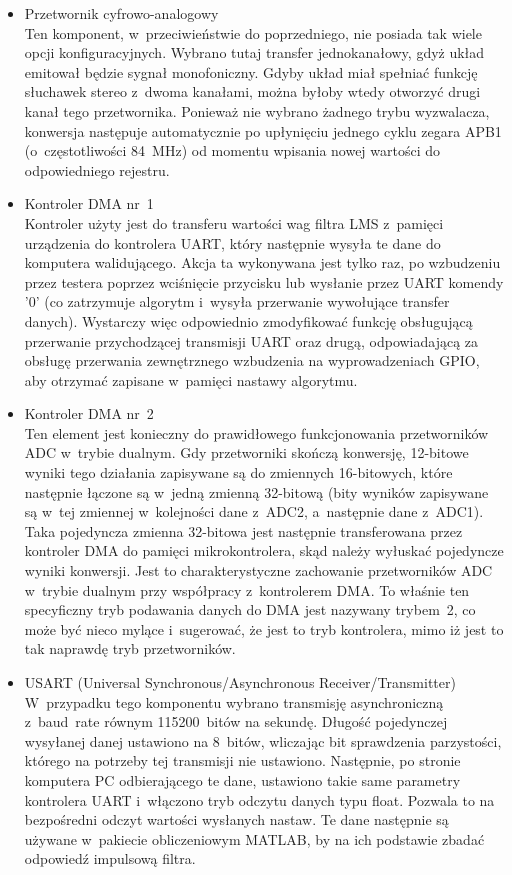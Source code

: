 \begin{itemize}
	\item Przetwornik cyfrowo-analogowy\\
	Ten komponent, w~przeciwieństwie do poprzedniego, nie posiada tak wiele opcji konfiguracyjnych. Wybrano tutaj transfer jednokanałowy, gdyż układ emitował będzie sygnał monofoniczny. Gdyby układ miał spełniać funkcję słuchawek stereo z~dwoma kanałami, można byłoby wtedy otworzyć drugi kanał tego przetwornika. Ponieważ nie wybrano żadnego trybu wyzwalacza, konwersja następuje automatycznie po upłynięciu jednego cyklu zegara APB1 (o~częstotliwości \SI{84}{\MHz}) od momentu wpisania nowej wartości do odpowiedniego rejestru.
	\item Kontroler DMA nr~1\\
	Kontroler użyty jest do transferu wartości wag filtra LMS z~pamięci urządzenia do kontrolera UART, który następnie wysyła te dane do komputera walidującego. Akcja ta wykonywana jest tylko raz, po wzbudzeniu przez testera poprzez wciśnięcie przycisku lub wysłanie przez UART komendy '0' (co zatrzymuje algorytm i~wysyła przerwanie wywołujące transfer danych). Wystarczy więc odpowiednio zmodyfikować funkcję obsługującą przerwanie przychodzącej transmisji UART oraz drugą, odpowiadającą za obsługę przerwania zewnętrznego wzbudzenia na wyprowadzeniach GPIO, aby otrzymać zapisane w~pamięci nastawy algorytmu.
	\item Kontroler DMA nr~2\\
	Ten element jest konieczny do prawidłowego funkcjonowania przetworników ADC w~trybie dualnym. Gdy przetworniki skończą konwersję, 12-bitowe wyniki tego działania zapisywane są do zmiennych 16-bitowych, które następnie łączone są w~jedną zmienną 32-bitową (bity wyników zapisywane są w~tej zmiennej w~kolejności dane z~ADC2, a~następnie dane z~ADC1). Taka pojedyncza zmienna 32-bitowa jest następnie transferowana przez kontroler DMA do pamięci mikrokontrolera, skąd należy wyłuskać pojedyncze wyniki konwersji. Jest to charakterystyczne zachowanie przetworników ADC w~trybie dualnym przy współpracy z~kontrolerem DMA. To właśnie ten specyficzny tryb podawania danych do DMA jest nazywany trybem~2, co może być nieco mylące i~sugerować, że jest to tryb kontrolera, mimo iż jest to tak naprawdę tryb przetworników.
	\item USART (Universal Synchronous/Asynchronous Receiver/Transmitter)\\
	W~przypadku tego komponentu wybrano transmisję asynchroniczną z~baud~rate równym 115200~bitów na sekundę. Długość pojedynczej wysyłanej danej ustawiono na 8~bitów, wliczając bit sprawdzenia parzystości, którego na potrzeby tej transmisji nie ustawiono. Następnie, po stronie komputera PC odbierającego te dane, ustawiono takie same parametry kontrolera UART i~włączono tryb odczytu danych typu float. Pozwala to na bezpośredni odczyt wartości wysłanych nastaw. Te dane następnie są używane w~pakiecie obliczeniowym MATLAB, by na ich podstawie zbadać odpowiedź impulsową filtra.
\end{itemize}
